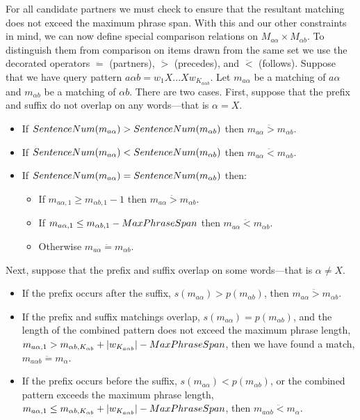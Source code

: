 For all candidate partners we must check to ensure that the resultant
matching does not exceed the maximum phrase span.
With this and our other constraints in mind, we can now define special 
comparison relations on 
$M_{a\alpha} \times M_{\alpha{}b}$.  To distinguish them
from comparison on items drawn from the same set we use the
decorated operators $\ddot{=}$ (partners), $\ddot{>}$ (precedes), and $\ddot{<}$ (follows).
Suppose that we have query pattern $a\alpha{}b = w_1 X ... X w_{K_{a\alpha{}b}}$.
Let $m_{a\alpha}$ be a matching of $a\alpha$ and $m_{\alpha{}b}$
be a matching of $\alpha{}b$.  There are two cases.
First, suppose that the prefix and suffix do not overlap on any words---that is $\alpha = X$.
	\begin{itemize}
		\item If $SentenceNum(m_{a\alpha}) > SentenceNum(m_{\alpha{}b})$ 
			then $m_{a\alpha{}} \ddot{>} m_{\alpha{}b}$.
		\item If $SentenceNum(m_{a\alpha}) < SentenceNum(m_{\alpha{}b})$ 
			then $m_{a\alpha{}} \ddot{<} m_{\alpha{}b}$.
		\item If $SentenceNum(m_{a\alpha}) = SentenceNum(m_{\alpha{}b})$ then:
		\begin{itemize}
			\item If $m_{a\alpha,1} \geq m_{\alpha{}b,1} - 1$ 
				then $m_{a\alpha} \ddot{>} m_{\alpha{}b}$.
			\item If $m_{a\alpha,1} \leq m_{\alpha{}b,1} - MaxPhraseSpan$ 
				then $m_{a\alpha} \ddot{<} m_{\alpha{}b}$.
			\item Otherwise $m_{a\alpha} \ddot{=} m_{\alpha{}b}$.
		\end{itemize}
	\end{itemize}
\noindent Next, suppose that the prefix and suffix overlap on some words---that is $\alpha \neq X$.
\begin{itemize}
	\item If the prefix occurs after the suffix, $s(m_{a\alpha}) > p(m_{\alpha{}b})$, then 
		$m_{a\alpha{}} \ddot{>} m_{\alpha{}b}$.
	\item If the prefix and suffix matchings overlap, $s(m_{a\alpha}) = p(m_{\alpha{}b})$, and the length of the combined pattern does not exceed the maximum phrase length,
		$m_{a\alpha,1} > m_{\alpha{}b,K_{\alpha{}b}} + |w_{K_{a\alpha{}b}}| - MaxPhraseSpan$, 
		then we have found a match, $m_{a\alpha{}b} \ddot{=} m_{\alpha}$.
	\item If the prefix occurs before the suffix, $s(m_{a\alpha}) < p(m_{\alpha{}b})$, or the combined pattern exceeds the maximum phrase length,
		$m_{a\alpha,1} \leq m_{\alpha{}b,K_{\alpha{}b}} + |w_{K_{a\alpha{}b}}| - MaxPhraseSpan$, 
		then $m_{a\alpha{}b} \ddot{<} m_{\alpha}$.
\end{itemize}


